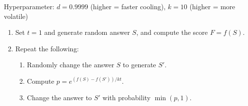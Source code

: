 Hyperparameter: $d = 0.9999$ (higher = faster cooling), $k = 10$ (higher = more volatile)
\begin{enumerate}
	\item Set $t = 1$ and generate random answer $S$, and compute the score $F = f(S)$.
	\item Repeat the following:
	\begin{enumerate}
		\item Randomly change the answer $S$ to generate $S'$.
		\item Compute $p = e^{(f(S) - f(S'))/kt}$.
		\item Change the answer to $S'$ with probability $\min(p, 1)$.
	\end{enumerate}
\end{enumerate}